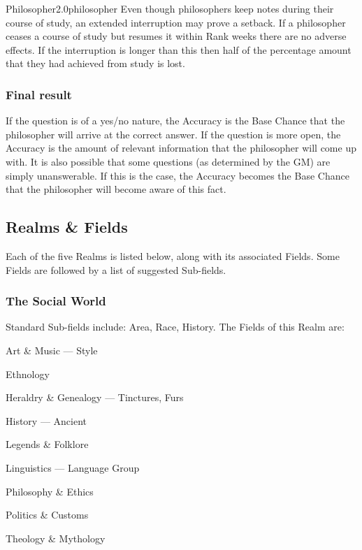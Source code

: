 \begin{skill}{Philosopher}{2.0}{philosopher}
Even though philosophers keep notes during their course of study, an
extended interruption may prove a setback.  If a philosopher ceases a
course of study but resumes it within Rank weeks there are no adverse
effects.  If the interruption is longer than this then half of the
percentage amount that they had achieved from study is lost.

\subsubsection{Final result}

If the question is of a yes/no nature, the Accuracy is the Base Chance
that the philosopher will arrive at the correct answer.  If the
question is more open, the Accuracy is the amount of relevant
information that the philosopher will come up with. It is also
possible that some questions (as determined by the GM) are simply
unanswerable.  If this is the case, the Accuracy becomes the Base
Chance that the philosopher will become aware of this fact.

\subsection{Realms \& Fields}

Each of the five Realms is listed below, along with its associated
Fields.  Some Fields are followed by a list of suggested Sub-fields.


\subsubsection{The Social World}

Standard Sub-fields include: Area, Race, History.  The Fields of this
Realm are:

\begin{Itemize}
\item Art \& Music --- Style
\item Ethnology
\item Heraldry \& Genealogy --- Tinctures, Furs
\item History --- Ancient
\item Legends \& Folklore
\item Linguistics --- Language Group
\item Philosophy \& Ethics
\item Politics \& Customs
\item Theology \& Mythology
\end{Itemize}


\end{skill}
